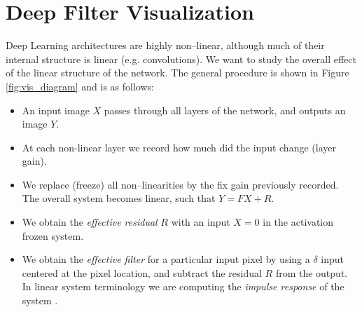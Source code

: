 \documentclass[letterpaper]{article}
\begin{document}
\section{Deep Filter Visualization}
\label{sec:visualization}
Deep Learning architectures are highly non--linear, although much of their internal structure is linear (e.g. convolutions). We want to study the overall effect of the linear structure of the network. The general procedure is shown in Figure \ref{fig:vis_diagram} and is as follows:
\begin{itemize}
    \item An input image $X$ passes through all layers of the network, and outputs an image $Y$.
    \item At each non-linear layer we record how much did the input change (layer gain).
    \item We replace (freeze) all non--linearities by the fix gain previously recorded. The overall system becomes linear, such that $Y = FX+R$.
    \item We obtain the \emph{effective residual} $R$ with an input $X=0$ in the activation frozen system.
    \item We obtain the \emph{effective filter} for a particular input pixel by using a $\delta$ input centered at the pixel location, and subtract the residual $R$ from the output. In linear system terminology we are computing the \emph{impulse response} of the system \cite{JGProakis_2007a}.
\end{itemize}
\end{document}

